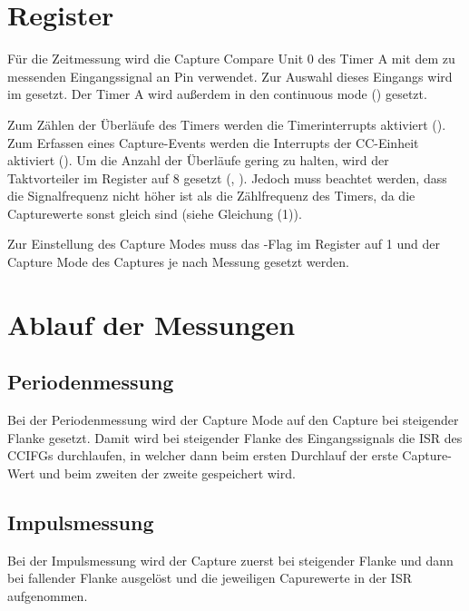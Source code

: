 \documentclass[a4paper, 12pt]{article}
\begin{document}
  
  \clearpage
  \setcounter{page}{1}

  \section{Register}
  Für die Zeitmessung wird die Capture Compare Unit 0 des Timer A mit dem zu
  messenden Eingangssignal an Pin  verwendet. Zur Auswahl dieses Eingangs
  wird im   gesetzt. Der Timer A wird
  außerdem in den continuous mode () gesetzt.

  Zum Zählen der Überläufe des Timers werden die Timerinterrupts aktiviert
  (). Zum Erfassen eines Capture-Events werden die Interrupts
  der CC-Einheit aktiviert ().
  Um die Anzahl der Überläufe gering zu halten, wird der Taktvorteiler im
   Register auf 8 gesetzt (,
  ). Jedoch muss beachtet werden, dass die Signalfrequenz
  nicht höher ist als die Zählfrequenz des Timers, da die Capturewerte sonst
  gleich sind (siehe Gleichung (1)).

  Zur Einstellung des Capture Modes muss das
  -Flag im  Register auf 1 und der Capture
  Mode  des Captures je nach Messung gesetzt werden.
 
  \section{Ablauf der Messungen}

  \subsection{Periodenmessung}
  Bei der Periodenmessung wird der Capture Mode auf den Capture bei steigender
  Flanke gesetzt. Damit wird bei steigender Flanke des Eingangssignals die ISR
  des CCIFGs durchlaufen, in welcher dann beim ersten Durchlauf der erste
  Capture-Wert und beim zweiten der zweite gespeichert wird.

  \subsection{Impulsmessung}
  Bei der Impulsmessung wird der Capture zuerst bei steigender Flanke und dann
  bei fallender Flanke ausgelöst und die jeweiligen Capurewerte in der ISR aufgenommen.
\end{document}
